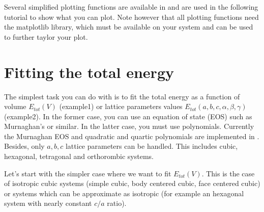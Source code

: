 \documentclass[letterpaper,10pt,english]{sphinxmanual}
\begin{document}
Several simplified plotting functions are available in  and are used in the following tutorial to show what you can plot.
Note however that all plotting functions need the matplotlib library, which must be available on your system and can be used to further taylor your plot.


\section{Fitting the total energy}
\label{tutorial:fitting-the-total-energy}
The simplest task you can do with  is to fit the total energy as a function of volume \(E_{tot}(V)\) (example1) or lattice parameters values \(E_{tot}(a,b,c,\alpha,\beta,\gamma)\) (example2). In the former case, you can use
an equation of state (EOS) such as Murnaghan's or similar. In the latter case, you must use polynomials. Currently the Murnaghan EOS and quadratic and quartic polynomials are implemented in . Besides, only \(a,b,c\) lattice parameters can be handled. This includes cubic, hexagonal, tetragonal and orthorombic systems.

Let's start with the simpler case where we want to fit \(E_{tot}(V)\). This is the case of isotropic cubic systems (simple cubic, body centered cubic, face centered cubic) or systems which can be approximate as isotropic (for example an hexagonal system with nearly constant \(c/a\) ratio).

\begin{sphinxVerbatim}[commandchars=\\\{\}]

    

    		
         	

                  	

\end{sphinxVerbatim}
\end{document}
